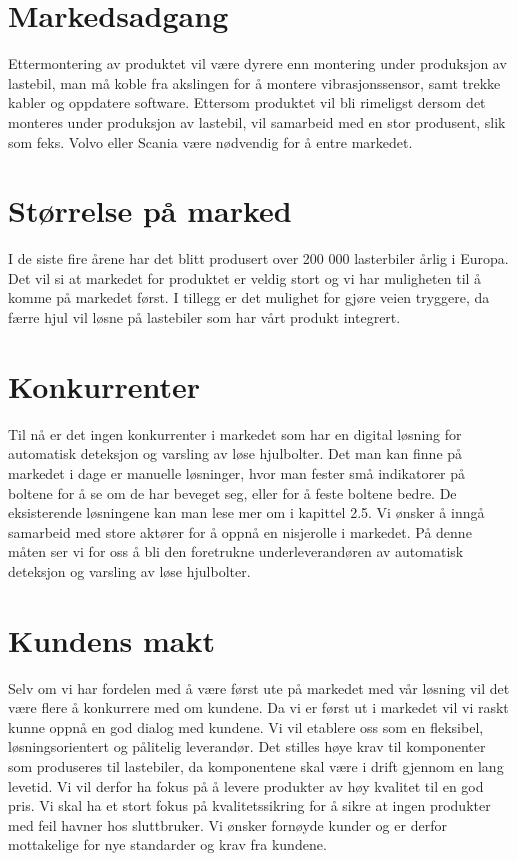 \section{Markedsadgang}
Ettermontering av produktet vil være dyrere enn montering under produksjon av lastebil, man må koble fra akslingen for å montere vibrasjonssensor, samt trekke kabler og oppdatere software. Ettersom produktet vil bli rimeligst dersom det monteres under produksjon av lastebil, vil  samarbeid med en stor produsent, slik som feks. Volvo eller Scania være nødvendig for å entre markedet. 
\section{Størrelse på marked}
I de siste fire årene har det blitt produsert over 200 000 lasterbiler årlig i Europa\cite{lastebilprod-DAF}. Det vil si at markedet for produktet er veldig stort og vi har muligheten til å komme på markedet først. I tillegg er det mulighet for gjøre veien tryggere, da færre hjul vil løsne på lastebiler som har vårt produkt integrert.
\section{Konkurrenter}
Til nå er det ingen konkurrenter i markedet som har en digital løsning for automatisk deteksjon og varsling av løse hjulbolter. Det man kan finne på markedet i dage er manuelle løsninger, hvor man fester små indikatorer på boltene for å se om de har beveget seg, eller for å feste boltene bedre. De eksisterende løsningene kan man lese mer om i kapittel 2.5.
Vi ønsker å inngå samarbeid med store aktører for å oppnå en nisjerolle i markedet. På denne måten ser vi for oss å bli den foretrukne underleverandøren av automatisk deteksjon og varsling av løse hjulbolter.
\section{Kundens makt}
Selv om vi har fordelen med å være først ute på markedet med vår løsning vil det være flere å konkurrere med om kundene. Da vi er først ut i markedet vil vi raskt kunne oppnå en god dialog med kundene. Vi vil etablere oss som en fleksibel, løsningsorientert og pålitelig leverandør. Det stilles høye krav til komponenter som produseres til lastebiler, da komponentene skal være i drift gjennom en lang levetid. Vi vil derfor ha fokus på å levere produkter av høy kvalitet til en god pris. Vi skal ha et stort fokus på kvalitetssikring for å sikre at ingen produkter med feil havner hos sluttbruker. Vi ønsker fornøyde kunder og er derfor mottakelige for nye standarder og krav fra kundene. 
